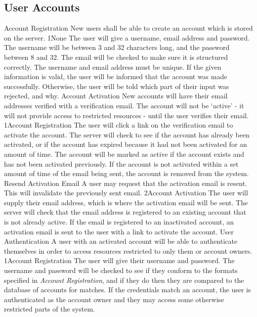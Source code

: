 	\subsection{User Accounts}
		\funcreq
			{Account Registration}
			{New users shall be able to create an account which is stored on the server.}
			{1}{None}
			{The user will give a username, email address and password.}
			{The username will be between 3 and 32 characters long, and the password between 8 and 32. The email will be checked to make sure it is structured correctly. The username and email address must be unique.}
			{If the given information is valid, the user will be informed that the account was made successfully. Otherwise, the user will be told which part of their input was rejected, and why.}
		\funcreq
			{Account Activation}
			{New accounts will have their email addresses verified with a verification email. The account will not be `active' - it will not provide access to restricted resources - until the user verifies their email.}
			{1}{Account Registration}
			{The user will click a link on the verification email to activate the account.}
			{The server will check to see if the account has already been activated, or if the account has expired because it had not been activated for an amount of time.}
			{The account will be marked as active if the account exists and has not been activated previously. If the account is not activated within a set amount of time of the email being sent, the account is removed from the system.}
		\funcreq
			{Resend Activation Email}
			{A user may request that the activation email is resent. This will invalidate the previously sent email.}
			{2}{Account Activation}
			{The user will supply their email address, which is where the activation email will be sent.}
			{The server will check that the email address is registered to an existing account that is not already active.}
			{If the email is registered to an inactivated account, an activation email is sent to the user with a link to activate the account.}
		\funcreq
			{User Authentication}
			{A user with an activated account will be able to authenticate themselves in order to access resources restricted to only them or account owners.}
			{1}{Account Registration}
			{The user will give their username and password.}
			{The username and password will be checked to see if they conform to the formats specified in \emph{Account Registration}, and if they do then they are compared to the database of accounts for matches.}
			{If the credentials match an account, the user is authenticated as the account owner and they may access some otherwise restricted parts of the system.}

